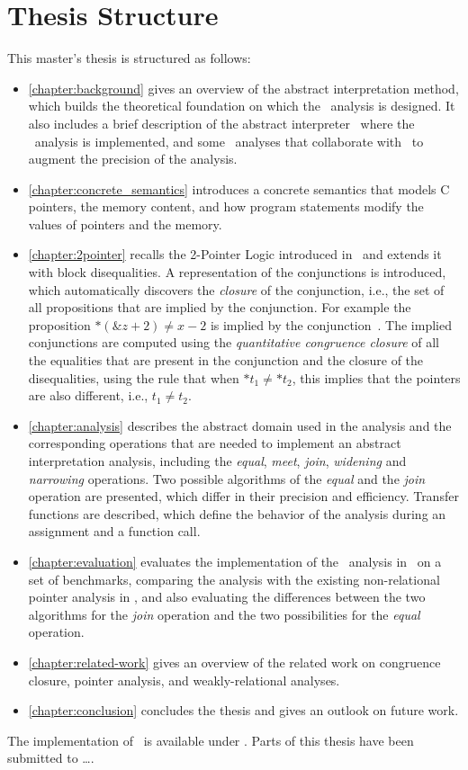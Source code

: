 \section{Thesis Structure}

This master's thesis is structured as follows:
\begin{itemize}
    \item \cref{chapter:background} gives an overview of the abstract interpretation method, which builds the theoretical foundation on which the \cpo\ analysis is designed.
          It also includes a brief description of the abstract interpreter \goblint\, where the \cpo\ analysis is implemented, and some \goblint\ analyses that collaborate with \cpo\ to augment the precision of the analysis.
    \item \cref{chapter:concrete_semantics} introduces a concrete semantics that models C pointers, the memory content, and how program statements modify the values of pointers and the memory.
    \item \cref{chapter:2pointer} recalls the 2-Pointer Logic introduced in~\cite{2pointer} and extends it with block disequalities.
          A representation of the conjunctions is introduced, which automatically discovers the \emph{closure} of the conjunction,
          i.e., the set of all propositions that are implied by the conjunction.
          For example the proposition $*(\&z + 2) \neq x - 2$ is implied by the conjunction~.
          The implied conjunctions are computed using the \emph{quantitative congruence closure} of all the equalities that are present in the conjunction and
          the closure of the disequalities, using the rule that when $*t_1 \neq *t_2$, this implies that the pointers are also different, i.e., $t_1 \neq t_2$.
    \item \cref{chapter:analysis} describes the abstract domain used in the analysis and the corresponding operations that are needed to implement an abstract interpretation analysis, including the \emph{equal}, \emph{meet}, \emph{join}, \emph{widening} and \emph{narrowing} operations.
          Two possible algorithms of the \emph{equal} and the \emph{join} operation are presented, which differ in
          their precision and efficiency.
          Transfer functions are described, which define the behavior of the analysis during an assignment and a function call.
    \item \cref{chapter:evaluation} evaluates the implementation of the \cpo\ analysis in \goblint\ on a set of benchmarks,
          comparing the analysis with the existing non-relational pointer analysis in \goblint, and also
          evaluating the differences between the two algorithms for the \emph{join} operation and the two possibilities for the \emph{equal} operation.
    \item \cref{chapter:related-work} gives an overview of the related work on congruence closure, pointer analysis, and weakly-relational analyses.
    \item \cref{chapter:conclusion} concludes the thesis and gives an outlook on future work.
\end{itemize}

The implementation of \cpo\ is available under . Parts of this thesis have been submitted to \dots.
